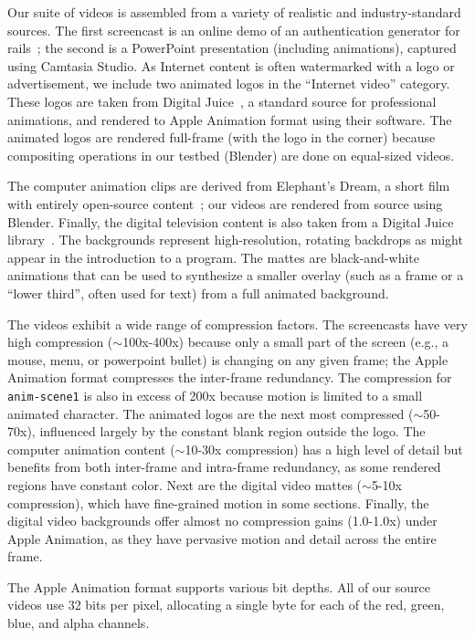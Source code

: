 Our suite of videos is assembled from a variety of realistic and
industry-standard sources.  The first screencast is an online demo of
an authentication generator for rails~\cite{auth-demo}; the second is
a PowerPoint presentation (including animations), captured using
Camtasia Studio.  As Internet content is often watermarked with a logo
or advertisement, we include two animated logos in the ``Internet
video'' category.  These logos are taken from Digital
Juice~\cite{digital-juice}, a standard source for professional
animations, and rendered to Apple Animation format using their
software.  The animated logos are rendered full-frame (with the logo
in the corner) because compositing operations in our testbed (Blender)
are done on equal-sized videos.

The computer animation clips are derived from Elephant's Dream, a
short film with entirely open-source content~\cite{elephants-dream};
our videos are rendered from source using Blender.  Finally, the
digital television content is also taken from a Digital Juice
library~\cite{digital-juice}.  The backgrounds represent
high-resolution, rotating backdrops as might appear in the
introduction to a program.  The mattes are black-and-white animations
that can be used to synthesize a smaller overlay (such as a frame or a
``lower third'', often used for text) from a full animated background.

The videos exhibit a wide range of compression factors.  The
screencasts have very high compression ($\sim$100x-400x) because only
a small part of the screen (e.g., a mouse, menu, or powerpoint bullet)
is changing on any given frame; the Apple Animation format compresses
the inter-frame redundancy.  The compression for {\tt anim-scene1} is
also in excess of 200x because motion is limited to a small animated
character.  The animated logos are the next most compressed
($\sim$50-70x), influenced largely by the constant blank region
outside the logo.  The computer animation content ($\sim$10-30x
compression) has a high level of detail but benefits from both
inter-frame and intra-frame redundancy, as some rendered regions have
constant color.  Next are the digital video mattes ($\sim$5-10x
compression), which have fine-grained motion in some sections.
Finally, the digital video backgrounds offer almost no compression
gains (1.0-1.0x) under Apple Animation, as they have pervasive motion
and detail across the entire frame.

The Apple Animation format supports various bit depths.  All of our
source videos use 32 bits per pixel, allocating a single byte for each
of the red, green, blue, and alpha channels.

